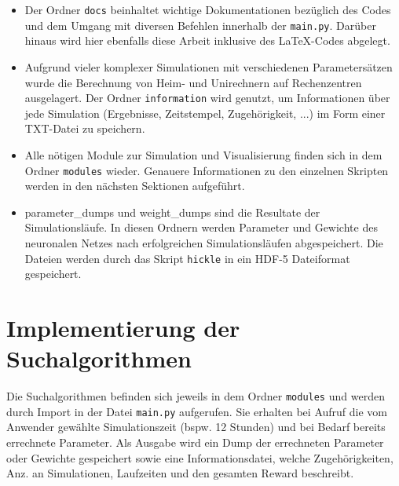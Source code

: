 	\begin{minipage}{0.65\textwidth}
		\begin{itemize}
			\item Der Ordner \texttt{docs} beinhaltet wichtige Dokumentationen bezüglich des Codes und dem Umgang mit diversen Befehlen innerhalb der \texttt{main.py}. Darüber hinaus wird hier ebenfalls diese Arbeit inklusive des \LaTeX-Codes abgelegt.
			\item Aufgrund vieler komplexer Simulationen mit verschiedenen Parametersätzen wurde die Berechnung von Heim- und Unirechnern auf Rechenzentren ausgelagert. Der Ordner \texttt{information} wird genutzt, um Informationen über jede Simulation (Ergebnisse, Zeitstempel, Zugehörigkeit, ...) im Form einer TXT-Datei zu speichern.
			\item Alle nötigen Module zur Simulation und Visualisierung finden sich in dem Ordner \texttt{modules} wieder. Genauere Informationen zu den einzelnen Skripten werden in den nächsten Sektionen aufgeführt.
			\item parameter\_dumps und weight\_dumps sind die Resultate der Simulationsläufe. In diesen Ordnern werden Parameter und Gewichte des neuronalen Netzes nach erfolgreichen Simulationsläufen abgespeichert. Die Dateien werden durch das Skript \texttt{hickle} in ein HDF-5 Dateiformat gespeichert.
		\end{itemize}		
	\end{minipage}
	
	
		
\section{Implementierung der Suchalgorithmen}
\label{sec:imp_search}
	Die Suchalgorithmen befinden sich jeweils in dem Ordner \texttt{modules} und werden durch Import in der Datei \texttt{main.py} aufgerufen. Sie erhalten bei Aufruf die vom Anwender gewählte Simulationszeit (bspw. 12 Stunden) und bei Bedarf bereits errechnete Parameter. Als Ausgabe wird ein Dump der errechneten Parameter oder Gewichte gespeichert sowie eine Informationsdatei, welche Zugehörigkeiten, Anz. an Simulationen, Laufzeiten und den gesamten Reward beschreibt. 
	
